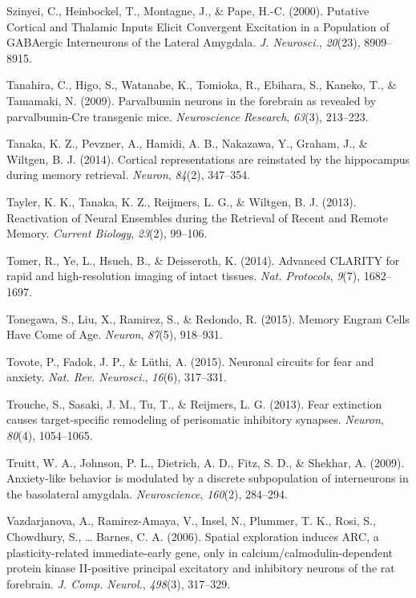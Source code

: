 \documentclass[12pt,a4paper,]{report}
\begin{document}
\hypertarget{ref-szinyeiux5fputativeux5f2000}{}
Szinyei, C., Heinbockel, T., Montagne, J., \& Pape, H.-C. (2000).
Putative Cortical and Thalamic Inputs Elicit Convergent Excitation in a
Population of GABAergic Interneurons of the Lateral Amygdala. \emph{J.
Neurosci.}, \emph{20}(23), 8909--8915.

\hypertarget{ref-tanahiraux5fparvalbuminux5f2009}{}
Tanahira, C., Higo, S., Watanabe, K., Tomioka, R., Ebihara, S., Kaneko,
T., \& Tamamaki, N. (2009). Parvalbumin neurons in the forebrain as
revealed by parvalbumin-Cre transgenic mice. \emph{Neuroscience
Research}, \emph{63}(3), 213--223.

\hypertarget{ref-tanakaux5fcorticalux5f2014}{}
Tanaka, K. Z., Pevzner, A., Hamidi, A. B., Nakazawa, Y., Graham, J., \&
Wiltgen, B. J. (2014). Cortical representations are reinstated by the
hippocampus during memory retrieval. \emph{Neuron}, \emph{84}(2),
347--354.

\hypertarget{ref-taylerux5freactivationux5f2013}{}
Tayler, K. K., Tanaka, K. Z., Reijmers, L. G., \& Wiltgen, B. J. (2013).
Reactivation of Neural Ensembles during the Retrieval of Recent and
Remote Memory. \emph{Current Biology}, \emph{23}(2), 99--106.

\hypertarget{ref-tomerux5fadvancedux5f2014}{}
Tomer, R., Ye, L., Hsueh, B., \& Deisseroth, K. (2014). Advanced CLARITY
for rapid and high-resolution imaging of intact tissues. \emph{Nat.
Protocols}, \emph{9}(7), 1682--1697.

\hypertarget{ref-tonegawaux5fmemoryux5f2015}{}
Tonegawa, S., Liu, X., Ramirez, S., \& Redondo, R. (2015). Memory Engram
Cells Have Come of Age. \emph{Neuron}, \emph{87}(5), 918--931.

\hypertarget{ref-tovoteux5fneuronalux5f2015}{}
Tovote, P., Fadok, J. P., \& Lüthi, A. (2015). Neuronal circuits for
fear and anxiety. \emph{Nat. Rev. Neurosci.}, \emph{16}(6), 317--331.

\hypertarget{ref-troucheux5ffearux5f2013}{}
Trouche, S., Sasaki, J. M., Tu, T., \& Reijmers, L. G. (2013). Fear
extinction causes target-specific remodeling of perisomatic inhibitory
synapses. \emph{Neuron}, \emph{80}(4), 1054--1065.

\hypertarget{ref-truittux5fanxiety-likeux5f2009}{}
Truitt, W. A., Johnson, P. L., Dietrich, A. D., Fitz, S. D., \& Shekhar,
A. (2009). Anxiety-like behavior is modulated by a discrete
subpopulation of interneurons in the basolateral amygdala.
\emph{Neuroscience}, \emph{160}(2), 284--294.

\hypertarget{ref-vazdarjanovaux5fspatialux5f2006}{}
Vazdarjanova, A., Ramirez-Amaya, V., Insel, N., Plummer, T. K., Rosi,
S., Chowdhury, S., \ldots{} Barnes, C. A. (2006). Spatial exploration
induces ARC, a plasticity-related immediate-early gene, only in
calcium/calmodulin-dependent protein kinase II-positive principal
excitatory and inhibitory neurons of the rat forebrain. \emph{J. Comp.
Neurol.}, \emph{498}(3), 317--329.
\end{document}
